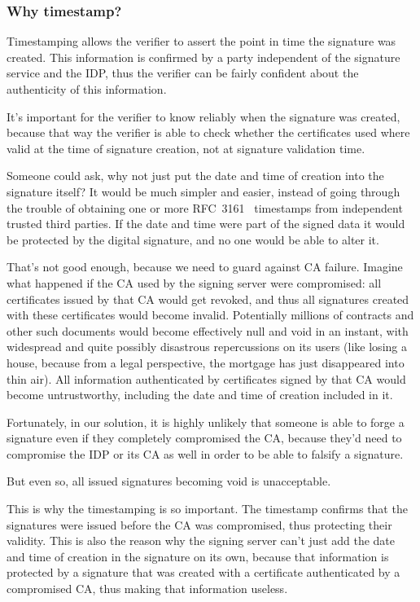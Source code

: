 \subsubsection{Why timestamp?}
Timestamping allows the verifier to assert the point in time the signature was created.
This information is confirmed by a party independent of the signature service and the \gls{IDP},
thus the verifier can be fairly confident about the authenticity of this information.

It's important for the verifier to know reliably when the signature was created,
because that way the verifier is able to check whether the certificates used where valid at the time of signature creation,
not at signature validation time.

Someone could ask, why not just put the date and time of creation into the signature itself?
It would be much simpler and easier,
instead of going through the trouble of obtaining one or more RFC~3161~\cite{rfc3161} timestamps
from independent trusted third parties.
If the date and time were part of the signed data it would be protected by the digital signature,
and no one would be able to alter it.

That's not good enough, because we need to guard against \gls{CA} failure.
Imagine what happened if the \gls{CA} used by the signing server were compromised:
all certificates issued by that \gls{CA} would get revoked,
and thus all signatures created with these certificates would become invalid.
Potentially millions of contracts and other such documents would become effectively null and void in an instant,
with widespread and quite possibly disastrous repercussions on its users
(like losing a house, because from a legal perspective, the mortgage has just disappeared into thin air).
All information authenticated by certificates signed by that \gls{CA} would become untrustworthy,
including the date and time of creation included in it.

Fortunately, in our solution, it is highly unlikely that someone is able to forge a signature even if they
completely compromised the \gls{CA}, because they'd need to compromise the \gls{IDP} or its \gls{CA} as well
in order to be able to falsify a signature.

But even so, all issued signatures becoming void is unacceptable.

This is why the timestamping is so important.
The timestamp confirms that the signatures were issued before the \gls{CA} was compromised,
thus protecting their validity.
This is also the reason why the signing server can't just add the date and time of creation in the signature on its own,
because that information is protected by a signature that was created with a certificate authenticated
by a compromised \gls{CA}, thus making that information useless.

